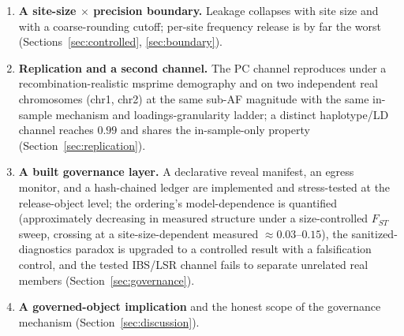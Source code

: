 \documentclass[11pt]{article}
\begin{document}
\begin{enumerate}
  attacker-realistic centering leaves it intact ($+0.10$); sample
  eigenvalues are unchanged (ratio $1.00$). An independent site's fitted basis
  separates another site's members only at chance ($0.50$), and a
  random-basis (eigenvalue-only) projection is at chance ($0.51$) whereas full
  loadings give $0.88$. The attack is
  implementable from the release alone \emph{if the study's PC loadings are
  shared}---as federated PCA shares them so each site can project its own
  genotypes (Section~\ref{sec:mechanism}).
  \item \textbf{A site-size $\times$ precision boundary.} Leakage collapses with
  site size and with a coarse-rounding cutoff; per-site frequency release is by
  far the worst (Sections~\ref{sec:controlled}, \ref{sec:boundary}).
  \item \textbf{Replication and a second channel.} The PC channel reproduces
  under a recombination-realistic msprime demography and on two independent real
  chromosomes (chr1, chr2) at the same sub-AF magnitude with the same
  in-sample mechanism and loadings-granularity ladder; a distinct haplotype/LD
  channel reaches $0.99$ and shares the in-sample-only property
  (Section~\ref{sec:replication}).
  \item \textbf{A built governance layer.} A declarative reveal manifest, an
  egress monitor, and a hash-chained ledger are implemented and stress-tested
  at the release-object level; the ordering's model-dependence is quantified
  (approximately decreasing in measured structure under a size-controlled $F_{ST}$ sweep,
  crossing at a site-size-dependent measured $\approx0.03$--$0.15$), the
  sanitized-diagnostics paradox is upgraded to a controlled result with a
  falsification control, and the tested IBS/LSR channel fails to separate
  unrelated real members (Section~\ref{sec:governance}).
  \item \textbf{A governed-object implication} and the honest scope of the
  governance mechanism (Section~\ref{sec:discussion}).
\end{enumerate}
\end{document}
